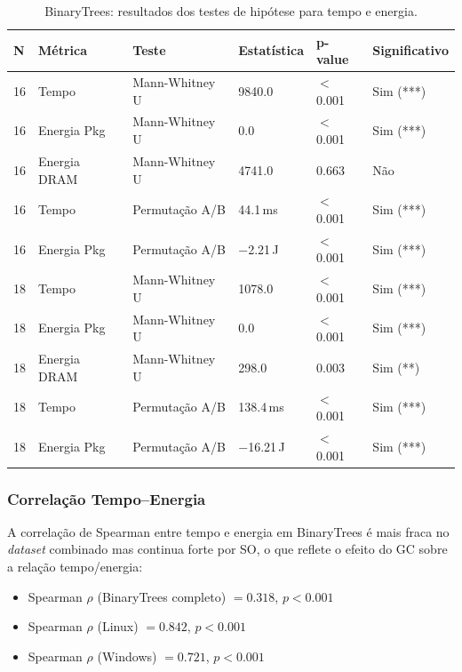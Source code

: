 \documentclass[12pt,a4paper]{article}
\begin{document}
\begin{table}[H]
  \centering
  \caption{BinaryTrees: resultados dos testes de hipótese para tempo e
    energia.}
  \label{tab:testes_bt}
  \begin{tabular}{llllll}
    \toprule
    \textbf{N} & \textbf{Métrica} & \textbf{Teste} & \textbf{Estatística} &
    \textbf{p-value} & \textbf{Significativo} \\
    \midrule
    16 & Tempo        & Mann-Whitney U  & 9840.0     & $<$0.001 & Sim (***) \\
    16 & Energia Pkg  & Mann-Whitney U  & 0.0        & $<$0.001 & Sim (***) \\
    16 & Energia DRAM & Mann-Whitney U  & 4741.0     & 0.663    & Não       \\
    16 & Tempo        & Permutação A/B  & 44.1\,ms   & $<$0.001 & Sim (***) \\
    16 & Energia Pkg  & Permutação A/B  & $-$2.21\,J & $<$0.001 & Sim (***) \\
    18 & Tempo        & Mann-Whitney U  & 1078.0     & $<$0.001 & Sim (***) \\
    18 & Energia Pkg  & Mann-Whitney U  & 0.0        & $<$0.001 & Sim (***) \\
    18 & Energia DRAM & Mann-Whitney U  & 298.0      & 0.003    & Sim (**)  \\
    18 & Tempo        & Permutação A/B  & 138.4\,ms  & $<$0.001 & Sim (***) \\
    18 & Energia Pkg  & Permutação A/B  & $-$16.21\,J & $<$0.001 & Sim (***) \\
    \bottomrule
  \end{tabular}
\end{table}

\subsubsection{Correlação Tempo--Energia}

A correlação de Spearman entre tempo e energia em BinaryTrees é mais fraca no
\textit{dataset} combinado mas continua forte por SO, o que reflete o efeito do
GC sobre a relação tempo/energia:
\begin{itemize}
  \item Spearman $\rho$ (BinaryTrees completo) $= 0.318$, $p < 0.001$
  \item Spearman $\rho$ (Linux) $= 0.842$, $p < 0.001$
  \item Spearman $\rho$ (Windows) $= 0.721$, $p < 0.001$
\end{itemize}
\end{document}
